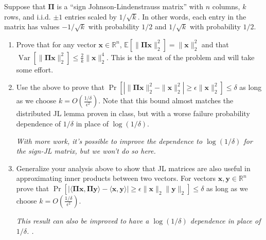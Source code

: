 \documentclass[10pt]{article}
\newcommand{\bs}[1]{\boldsymbol{#1}}
\newcommand{\bv}[1]{\mathbf{#1}}
\newcommand{\R}{\mathbb{R}}
\newcommand{\E}{\mathbb{E}}
\DeclareMathOperator{\Var}{Var}
\begin{document}
Suppose that $\bs{\Pi}$ is a ``sign Johnson-Lindenstrauss matrix'' with $n$ columns, $k$ rows, and i.i.d. $\pm 1$ entries scaled by $1/\sqrt{k}$. In other words, each entry in the matrix has values $-1/\sqrt{k}$ with probability $1/2$ and $1/\sqrt{k}$ with probability $1/2$.
\begin{enumerate}
	\item Prove that for any vector $\bv{x}\in \R^n$, $\E[\|\bs{\Pi}\bv{x}\|_2^2] = \|\bv{x}\|_2^2$ and that $\Var[\|\bs{\Pi}\bv{x}\|_2^2] \leq \frac{2}{k}\|\bv{x}\|_2^4$. This is the meat of the problem and will take some effort. 
	\vspace{.5em}

	
	\item Use the above to prove that $\Pr\left[\left|\|\bs{\Pi}\bv{x}\|_2^2 - \|\bv{x}\|_2^2\right| \geq \epsilon\|\bv{x}\|_2^2 \right] \leq \delta$ as long as we choose $k = O\left(\frac{1/\delta}{\epsilon^2}\right)$. Note that this bound almost matches the distributed JL lemma proven in class, but with a worse failure probability dependence of $1/\delta$ in place of $\log(1/\delta)$. 
	\vspace{.5em}
	
	\textit{With more work, it's possible to improve the dependence to $\log(1/\delta)$ for the sign-JL matrix, but we won't do so here.}
	
	\item Generalize your analysis above to show that JL matrices are also useful in approximating inner products between two vectors. For vectors $\bv{x},\bv{y}\in \R^n$ prove that $\Pr\left[\left|\langle \bs{\Pi}\bv{x}, \bs{\Pi}\bv{y}\rangle -  \langle  \bv{x}, \bv{y}\rangle\right| \geq \epsilon\|\bv{x}\|_2\|\bv{y}\|_2\right] \leq \delta$ as long as we choose $k = O\left(\frac{1/\delta}{\epsilon^2}\right)$.
	
		\textit{This result can also be improved to have a $\log(1/\delta)$ dependence in place of $1/\delta$. .}
\end{enumerate}
\end{document}
